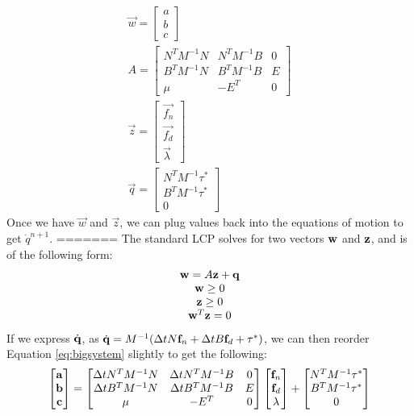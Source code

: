 \begin{equation}
\label{eq:slcp1}
\begin{array}{cc}
\vec{w} = \left[\begin{matrix}a \\ b \\ c\end{matrix}\right] \\
A = \left[\begin{matrix}N^TM^{-1}N & N^TM^{-1}B & 0 \\ B^TM^{-1}N & B^TM^{-1}B & E \\ \mu & -E^T & 0\end{matrix}\right] \\
\vec{z} = \left[\begin{matrix}\vec{f_n} \\ \vec{f_d} \\ \vec{\lambda}\end{matrix}\right] \\
\vec{q} = \left[\begin{matrix}N^TM^{-1}\tau^* \\ B^TM^{-1}\tau^* \\ 0\end{matrix}\right]
\end{array}
\end{equation}
Once we have $\vec{w}$ and $\vec{z}$, we can plug values back into the equations of motion to get $\dot{q}^{n + 1}$.
=======
The standard LCP solves for two vectors $\mathbf{w}$ and $\mathbf{z}$, and is of the following form:
\begin{equation}
\begin{array}{cc}
\mathbf{w} = A\mathbf{z} + \mathbf{q} \\
\mathbf{w} \geq 0 \\
\mathbf{z} \geq 0 \\
\mathbf{w}^T\mathbf{z} = 0
\end{array}
\end{equation}
If we express $\dot{\mathbf{q}}$, as $\dot{\mathbf{q}} = M^{-1}(\Delta t
N\mathbf{f}_n + \Delta t B\mathbf{f}_d + \tau^*)$, we can then reorder Equation \ref{eq:bigsystem} slightly to get the following:
\begin{equation}
\label{eq:slcp0}
\left[\begin{matrix}\mathbf{a} \\ \mathbf{b} \\ \mathbf{c}\end{matrix}\right] =
\left[\begin{matrix}\Delta t N^TM^{-1}N & \Delta t N^TM^{-1}B & 0 \\ \Delta t B^TM^{-1}N & \Delta t B^TM^{-1}B & E \\ \mu & -E^T & 0\end{matrix}\right]\left[\begin{matrix}\mathbf{f}_n \\ \mathbf{f}_d \\ \lambda\end{matrix}\right] + \left[\begin{matrix}N^TM^{-1}\tau^* \\ B^TM^{-1}\tau^* \\ 0\end{matrix}\right]
\end{equation}
